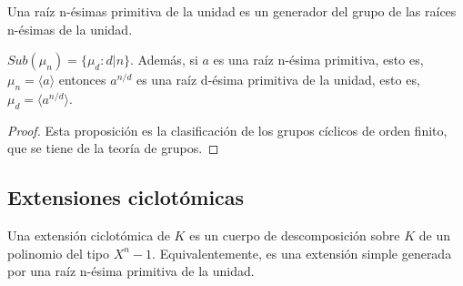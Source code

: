 \begin{definition}
Una raíz n-ésimas primitiva de la unidad es un generador del grupo de las raíces n-ésimas de la unidad. 
\end{definition}

\begin{proposition}
$Sub(\mu_n) = \{\mu_d:d | n \}$. Además, si $a$ es una raíz n-ésima primitiva, esto es, $\mu_n = \langle a \rangle$ entonces $a^{n/d}$ es una raíz d-ésima primitiva de la unidad, esto es, $\mu_d = \langle a^{n/d} \rangle$. 
\end{proposition}
\begin{proof}
Esta proposición es la clasificación de los grupos cíclicos de orden finito, que se tiene de la teoría de grupos. 
\end{proof}

\subsection{Extensiones ciclotómicas}

\begin{definition}
Una extensión ciclotómica de $K$ es un cuerpo de descomposición sobre $K$ de un polinomio del tipo $X^n-1$. Equivalentemente, es una extensión simple generada por una raíz n-ésima primitiva de la unidad. 
\end{definition}

